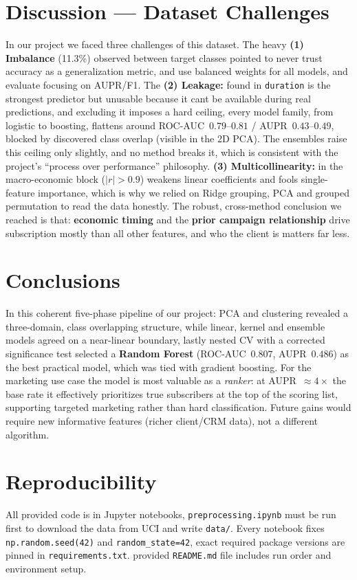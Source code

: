 \documentclass[11pt]{article}
\begin{document}
\section{Discussion --- Dataset Challenges}
In our project we faced three challenges of this dataset. The heavy \textbf{(1) Imbalance} (11.3\%) observed between target classes pointed to never trust
accuracy as a generalization metric, and use balanced weights for all models, and evaluate focusing on AUPR/F1. The \textbf{(2) Leakage:} found in \texttt{duration} is the strongest predictor but unusable because it cant be available during real predictions, and excluding it imposes a hard ceiling,  every model family, from logistic to boosting, flattens  around ROC-AUC~$0.79$--$0.81$ / AUPR~$0.43$--$0.49$, blocked by discovered class overlap (visible in the 2D PCA). The ensembles raise this ceiling only slightly, and no method breaks it, which is consistent with the project's ``process over performance'' philosophy.
\textbf{(3) Multicollinearity:} in the macro-economic  block ($|r|>0.9$) weakens linear coefficients and fools
single-feature importance, which is why we relied on Ridge grouping, PCA and grouped permutation to read
the data honestly. The robust, cross-method conclusion  we reached is that: \textbf{economic timing} and the \textbf{prior campaign relationship} drive subscription mostly than all other features, and who the client is matters far less.

\section{Conclusions}
In this coherent five-phase pipeline of our project: PCA and clustering revealed a three-domain, class overlapping structure, while linear, kernel
and ensemble models agreed on a near-linear boundary, lastly nested CV with a corrected significance
test selected a \textbf{Random Forest} (ROC-AUC~$0.807$, AUPR~$0.486$) as the best practical model, which was 
tied with gradient boosting. For the marketing use case
the model is most valuable as a \emph{ranker}: at AUPR~$\approx 4\times$ the base rate it effectively prioritizes true subscribers at the top of the scoring list, supporting targeted marketing rather than hard classification. Future gains would require new informative features (richer client/CRM data), not a different algorithm.

\section*{Reproducibility}
All provided code is in Jupyter notebooks,
\texttt{preprocessing.ipynb} must be run first to download the data from UCI and write \texttt{data/}. Every notebook fixes \texttt{np.random.seed(42)} and \texttt{random\_state=42}, exact required package versions are pinned in \texttt{requirements.txt}. provided \texttt{README.md} file includes run order and environment setup.
\end{document}
